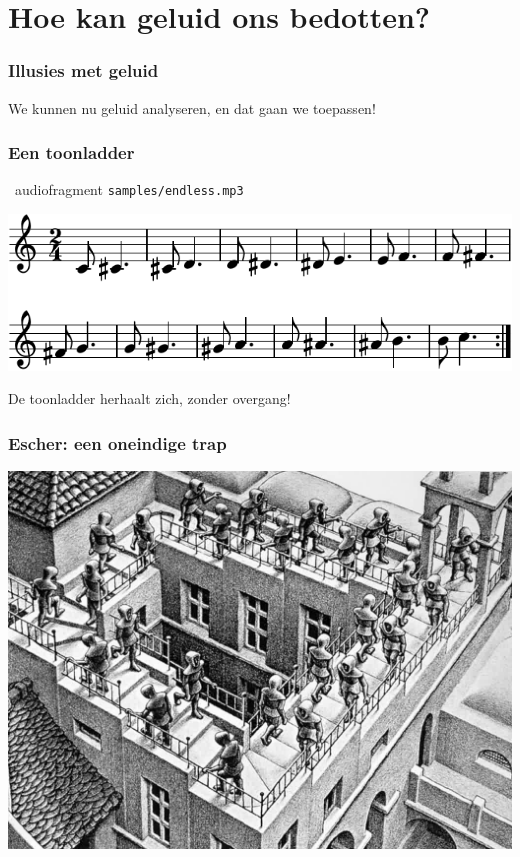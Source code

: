 \documentclass[compress, darktitle, framenumber, handout, totalframenumber]{beamer}
\begin{document}
\section{Hoe kan geluid ons bedotten?}
\begin{frame}
  \frametitle{Illusies met geluid}

  We kunnen nu geluid analyseren, en dat gaan we toepassen!

  \centering
\end{frame}

\begin{frame}
  \frametitle{Een toonladder}

  \begin{block}{\twonotes\ audiofragment}
    \texttt{samples/endless.mp3}
  \end{block}
  \pause
  \begin{center}
    \includegraphics{scores/endless-cropped}
  \end{center}
  \pause
  De toonladder \alert{herhaalt} zich, zonder overgang!
\end{frame}

\begin{frame}
  \frametitle{Escher: een oneindige trap}

  \centering
  \includegraphics[width=.8\textwidth]{images/escher}
\end{frame}
\end{document}
